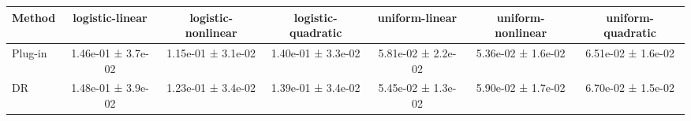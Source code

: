 \begin{tabular}{lcccccc}
\toprule
Method & logistic-linear & logistic-nonlinear & logistic-quadratic & uniform-linear & uniform-nonlinear & uniform-quadratic \\
\midrule
Plug-in & 1.46e-01 ± 3.7e-02 & 1.15e-01 ± 3.1e-02 & 1.40e-01 ± 3.3e-02 & 5.81e-02 ± 2.2e-02 & 5.36e-02 ± 1.6e-02 & 6.51e-02 ± 1.6e-02 \\
DR & 1.48e-01 ± 3.9e-02 & 1.23e-01 ± 3.4e-02 & 1.39e-01 ± 3.4e-02 & 5.45e-02 ± 1.3e-02 & 5.90e-02 ± 1.7e-02 & 6.70e-02 ± 1.5e-02 \\
\bottomrule
\end{tabular}
